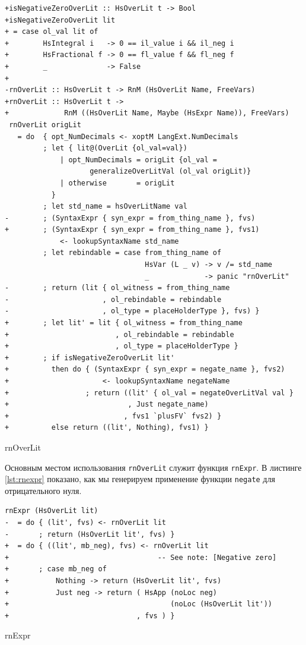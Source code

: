 \begin{ListingEnv}[H]
\begin{lstlisting}
+isNegativeZeroOverLit :: HsOverLit t -> Bool
+isNegativeZeroOverLit lit
+ = case ol_val lit of
+        HsIntegral i   -> 0 == il_value i && il_neg i
+        HsFractional f -> 0 == fl_value f && fl_neg f
+        _              -> False
+
-rnOverLit :: HsOverLit t -> RnM (HsOverLit Name, FreeVars)
+rnOverLit :: HsOverLit t ->
+             RnM ((HsOverLit Name, Maybe (HsExpr Name)), FreeVars)
 rnOverLit origLit
   = do  { opt_NumDecimals <- xoptM LangExt.NumDecimals
         ; let { lit@(OverLit {ol_val=val})
             | opt_NumDecimals = origLit {ol_val =
                    generalizeOverLitVal (ol_val origLit)}
             | otherwise       = origLit
           }
         ; let std_name = hsOverLitName val
-        ; (SyntaxExpr { syn_expr = from_thing_name }, fvs)
+        ; (SyntaxExpr { syn_expr = from_thing_name }, fvs1)
             <- lookupSyntaxName std_name
         ; let rebindable = case from_thing_name of
                                 HsVar (L _ v) -> v /= std_name
                                 _             -> panic "rnOverLit"
-        ; return (lit { ol_witness = from_thing_name
-                      , ol_rebindable = rebindable
-                      , ol_type = placeHolderType }, fvs) }
+        ; let lit' = lit { ol_witness = from_thing_name
+                         , ol_rebindable = rebindable
+                         , ol_type = placeHolderType }
+        ; if isNegativeZeroOverLit lit'
+          then do { (SyntaxExpr { syn_expr = negate_name }, fvs2)
+                      <- lookupSyntaxName negateName
+                  ; return ((lit' { ol_val = negateOverLitVal val }
+                            , Just negate_name)
+                           , fvs1 `plusFV` fvs2) }
+          else return ((lit', Nothing), fvs1) }
\end{lstlisting}
\caption{rnOverLit}
\label{lst:rnoverlit}
\end{ListingEnv}

Основным местом использования \texttt{rnOverLit} служит функция
\texttt{rnExpr}. В листинге \ref{lst:rnexpr} показано, как мы генерируем
применение функции \texttt{negate} для отрицательного нуля.

\begin{ListingEnv}[H]
\begin{lstlisting}
rnExpr (HsOverLit lit)
-  = do { (lit', fvs) <- rnOverLit lit
-       ; return (HsOverLit lit', fvs) }
+  = do { ((lit', mb_neg), fvs) <- rnOverLit lit
+                                   -- See note: [Negative zero]
+       ; case mb_neg of
+           Nothing -> return (HsOverLit lit', fvs)
+           Just neg -> return ( HsApp (noLoc neg)
+                                      (noLoc (HsOverLit lit'))
+                              , fvs ) }
\end{lstlisting}
\caption{rnExpr}
\label{lst:rnexpr}
\end{ListingEnv}

